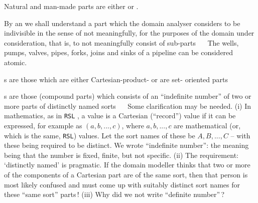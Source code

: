 \pind Natural and man-made parts are either
\begynd
\pind {} or
\pind {}.
\afslut
\afslut 
      \sl
{}  \sl 
{}
\begynd
\pind By an  we shall understand a part
\begynd
\pind which the domain analyser considers to be indivisible
\pind in the sense of not meaningfully,
\pind for the purposes of the domain under consideration,
\pind that is, to not meaningfully consist of sub-parts \dbsquare\ \ \rm
\afslut
\afslut The
\begynd
\pind wells,
\pind pumps, 
\pind valves, 
\pind pipes, 
\pind forks, 
\pind joins and 
\pind sinks
\afslut of a pipeline can be considered atomic.
      \sl
{} \sl 
{}
\begynd
\pind {}s are those which are
\begynd
\pind either Cartesian-product-
\pind or are set-
\afslut
\pind oriented parts  \eod \ \rm
\afslut
      \sl
{} \sl 
{}
\begynd
\pind {}s are those (compound parts)
\begynd
\pind which consists of an ``indefinite number'' 
\pind of two or more parts 
\pind of distinctly named sorts \dbsquare\ \ \rm
\afslut
\afslut
\begynd
\pind Some clarification may be needed.
\begynd
\pind (i) In mathematics, as in \texttt{RSL} \citersl, 
\begynd
\pind a value is a Cartesian (``record'') value 
\pind if it can be expressed, for example as $(a,b,...,c)$,
\pind where $a, b, ..., c$ are mathematical (or, which is the same, \texttt{RSL}) values.
\pind Let the sort names of these be $A, B, ..., C$ --
\pind with these being required to be distinct.
\pind We wrote ``indefinite number'':
\begynd
\pind the meaning being that the number is fixed, finite, but not specific.
\afslut
\afslut
\afslut
\pind (ii) The requirement: `distinctly named' is pragmatic.
\begynd
\pind If the domain modeller thinks 
\pind that two or
      more of the components of a  Cartesian part 
\pind [really] are of the same sort, 
\pind then that person is most likely confused
\pind and must come up with suitably distinct sort names for these
      ``same sort'' parts\,!
\afslut
\pind (iii) Why did we not write ``definite number''\,?
